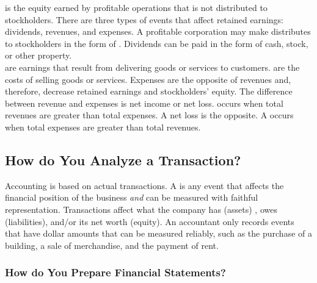 \documentclass{article}
\begin{document}
 is the equity earned by profitable operations that is not distributed to stockholders. There are three types of events that affect retained earnings: dividends, revenues, and expenses. A profitable corporation may make distributes to stockholders in the form of . Dividends can be paid in the form of cash, stock, or other property. \\ 

 are earnings that result from delivering goods or services to customers.  are the costs of selling goods or services. Expenses are the opposite of revenues and, therefore, decrease retained earnings and stockholders' equity. The difference between revenue and expenses is net income or net loss.  occurs when total revenues are greater than total expenses. A net loss is the opposite. A  occurs when total expenses are greater than total revenues. 

\subsection{How do You Analyze a Transaction?}

Accounting is based on actual transactions. A  is any event that affects the financial position of the business \emph{and} can be measured with faithful representation. Transactions affect what the company has (assets) , owes (liabilities), and/or its net worth (equity). An accountant only records events that have dollar amounts that can be measured reliably, such as the purchase of a building, a sale of merchandise, and the payment of rent. \\ 

\subsubsection{How do You Prepare Financial Statements?}
\end{document}
